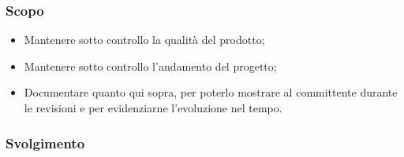 \subsubsection*{Scopo}
\begin{itemize}
	\item Mantenere sotto controllo la qualità del prodotto;
	\item Mantenere sotto controllo l'andamento del progetto;
	\item Documentare quanto qui sopra, per poterlo mostrare al committente
	      durante le revisioni e per evidenziarne l'evoluzione nel tempo.
\end{itemize}

\subsubsection*{Svolgimento}
